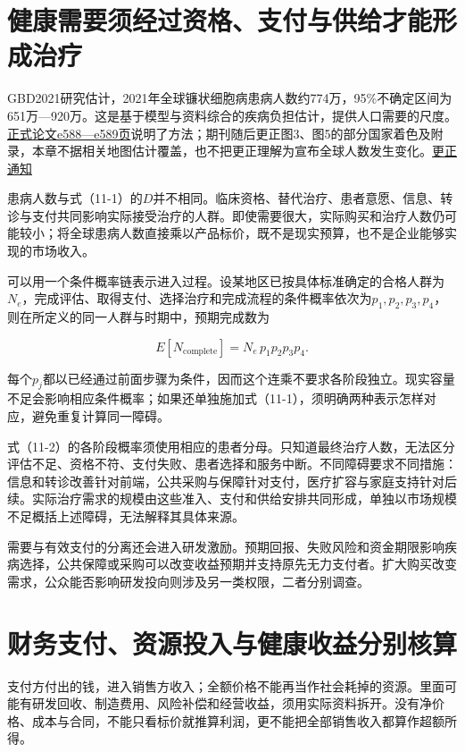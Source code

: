 \documentclass[UTF8,fontset=windows,12pt,a4paper,oneside,openany]{ctexbook}
\begin{document}
\section{健康需要须经过资格、支付与供给才能形成治疗}

GBD2021研究估计，2021年全球镰状细胞病患病人数约774万，95\%不确定区间为651万—920万。这是基于模型与资料综合的疾病负担估计，提供人口需要的尺度。\href{https://repository.up.ac.za/server/api/core/bitstreams/fd57c857-9ec2-4897-b38c-ff955abb4bb0/content}{正式论文e588—e589页}说明了方法；期刊随后更正图3、图5的部分国家着色及附录，本章不据相关地图估计覆盖，也不把更正理解为宣布全球人数发生变化。\href{https://doi.org/10.1016/S2352-3026(23)00215-6}{更正通知}

患病人数与式（11-1）的\(D\)并不相同。临床资格、替代治疗、患者意愿、信息、转诊与支付共同影响实际接受治疗的人群。即使需要很大，实际购买和治疗人数仍可能较小；将全球患病人数直接乘以产品标价，既不是现实预算，也不是企业能够实现的市场收入。

可以用一个条件概率链表示进入过程。设某地区已按具体标准确定的合格人群为\(N_e\)，完成评估、取得支付、选择治疗和完成流程的条件概率依次为\(p_1,p_2,p_3,p_4\)，则在所定义的同一人群与时期中，预期完成数为

\[
E[N_{\mathrm{complete}}]=N_e\,p_1p_2p_3p_4.
\tag{11-2}
\]

每个\(p_j\)都以已经通过前面步骤为条件，因而这个连乘不要求各阶段独立。现实容量不足会影响相应条件概率；如果还单独施加式（11-1），须明确两种表示怎样对应，避免重复计算同一障碍。

式（11-2）的各阶段概率须使用相应的患者分母。只知道最终治疗人数，无法区分评估不足、资格不符、支付失败、患者选择和服务中断。不同障碍要求不同措施：信息和转诊改善针对前端，公共采购与保障针对支付，医疗扩容与家庭支持针对后续。实际治疗需求的规模由这些准入、支付和供给安排共同形成，单独以市场规模不足概括上述障碍，无法解释其具体来源。

需要与有效支付的分离还会进入研发激励。预期回报、失败风险和资金期限影响疾病选择，公共保障或采购可以改变收益预期并支持原先无力支付者。扩大购买改变需求，公众能否影响研发投向则涉及另一类权限，二者分别调查。

\section{财务支付、资源投入与健康收益分别核算}

支付方付出的钱，进入销售方收入；全额价格不能再当作社会耗掉的资源。里面可能有研发回收、制造费用、风险补偿和经营收益，须用实际资料拆开。没有净价格、成本与合同，不能只看标价就推算利润，更不能把全部销售收入都算作超额所得。
\end{document}

